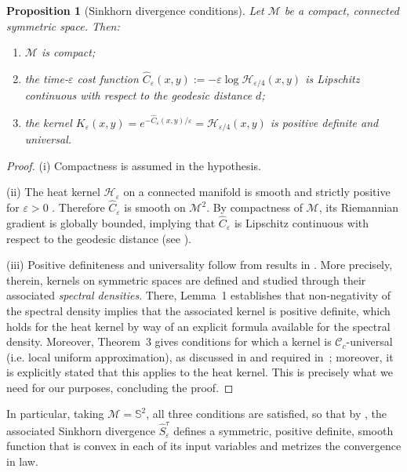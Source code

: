 \documentclass{article}
\theoremstyle{plain}
\newtheorem{proposition}[theorem]{Proposition}
\theoremstyle{definition}
\theoremstyle{remark}
\renewcommand{\S}{\ensuremath{\mathbb{S}}}
\newcommand{\M}{\ensuremath{\mathcal{M}}}
\begin{document}
\begin{proposition}[Sinkhorn divergence conditions]\label{prop:sinkh:cond:restate}
Let $\M$ be a compact, connected symmetric space. Then:
\begin{enumerate}[label=(\roman*)]
\item $\M$ is compact;
\item the time-$\varepsilon$ cost function $\widehat C_\varepsilon(x,y) := -\varepsilon \log\mathcal{H}_{\varepsilon/4}(x,y)$ is Lipschitz continuous with respect to the geodesic distance $d$;
\item the kernel $K_\varepsilon(x,y) = e^{-\widehat C_\varepsilon(x,y)/\varepsilon} = \mathcal{H}_{\varepsilon/4}(x,y)$ is positive definite and universal.
\end{enumerate}
\end{proposition}

\begin{proof}
(i) Compactness is assumed in the hypothesis.

(ii) The heat kernel $\mathcal{H}_\varepsilon$ on a connected manifold is smooth and strictly positive for $\varepsilon>0$ \cite[Thm.~7.20, Cor.~8.12]{grigoryan2009heat}. Therefore $\widehat C_\varepsilon$ is smooth on $\M^2$. By compactness of $\M$, its Riemannian gradient is globally bounded, implying that $\widehat C_\varepsilon$ is Lipschitz continuous with respect to the geodesic distance (see \cite[Prop.~10.43]{boumal2023introduction}). %

(iii) Positive definiteness and universality follow from results in \cite{steinert2025universal}. More precisely, therein, kernels on symmetric spaces are defined and studied through their associated \emph{spectral densities}. There, Lemma~1 establishes that non-negativity of the spectral density implies that the associated kernel is positive definite, which holds for the heat kernel by way of an explicit formula available for the spectral density. Moreover, Theorem~3 gives conditions for which a kernel is $\mathcal{C}_{c}$-universal (i.e. local uniform approximation), as discussed in \cite{micchelli2006universal} and required in~\cite{pmlr-v89-feydy19a}; moreover, it is explicitly stated that this applies to the heat kernel. This is precisely what we need for our purposes, concluding the proof.
\end{proof}

In particular, taking $\M = \S^2$, all three conditions are satisfied, so that by \cite[Theorem 5 \& 6]{sejourne2019sinkhorn}, the associated Sinkhorn divergence $\hat{S}^\tau_\varepsilon$ defines a symmetric, positive definite, smooth function that is convex in each of its input variables and metrizes the convergence in law.
\end{document}
